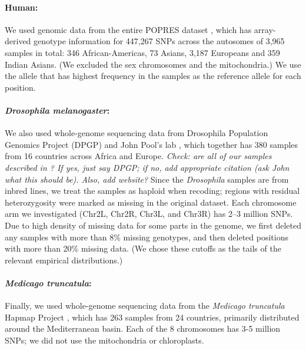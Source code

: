 \documentclass[11pt, oneside]{article}   	%
\newcommand{\plr}[1]{{\em \color{blue} #1}}
\begin{document}
\paragraph{Human:}
We used genomic data from the entire POPRES dataset \citep{nelson2008population},
which has array-derived genotype information for 447,267 SNPs across the autosomes
of 3,965 samples in total: 346 African-Americas, 73 Asians, 3,187 Europeans and 359 Indian Asians.
(We excluded the sex chromosomes and the mitochondria.)
We use the allele that has highest frequency in the samples as the reference allele for each position. 

\paragraph{\textit{Drosophila melanogaster}:}
We also used whole-genome sequencing data from Drosophila Population Genomics Project (DPGP) and John Pool's lab \citep{lack2015drosophila}, 
which together has 380 samples from 16 countries across Africa and Europe.
\plr{Check: are all of our samples described in \citet{lack2015drosophila}? If yes, just say DPGP; if no, add appropriate citation (ask John what this should be). Also, add website?}
Since the \textit{Drosophila} samples are from inbred lines, we treat the samples as haploid when recoding;
regions with residual heterozygosity were marked as missing in the original dataset.
Each chromosome arm we investigated (Chr2L, Chr2R, Chr3L, and Chr3R) has 2--3 million SNPs.
Due to high density of missing data for some parts in the genome, 
we first deleted any samples with more than 8\% missing genotypes, 
and then deleted positions with more than 20\% missing data. 
(We chose these cutoffs as the tails of the relevant empirical distributions.)

\paragraph{\textit{Medicago truncatula}:}
Finally, we used whole-genome sequencing data from the \textit{Medicago truncatula} Hapmap Project \citep{tang2014improved},
which has 263 samples from 24 countries,
primarily distributed around the Mediterranean basin.
Each of the 8 chromosomes has 3-5 million SNPs;
we did not use the mitochondria or chloroplasts.
\end{document}

